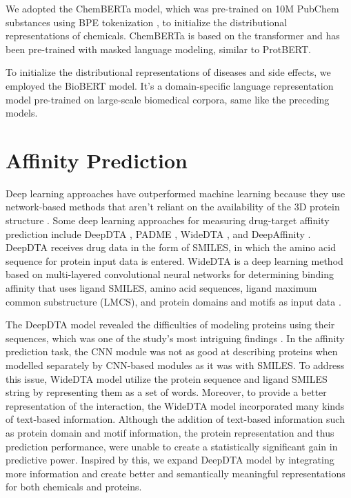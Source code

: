 We adopted the ChemBERTa \cite{chithrananda2020chemberta} model, which was pre-trained on 10M PubChem substances using BPE tokenization \cite{sennrich2015neural}, to initialize the distributional representations of chemicals. ChemBERTa is based on the transformer and has been pre-trained with masked language modeling, similar to ProtBERT.

To initialize the distributional representations of diseases and side effects, we employed the BioBERT \cite{lee2020biobert} model. It's a domain-specific language representation model pre-trained on large-scale biomedical corpora, same like the preceding models.

\section{Affinity Prediction}
Deep learning approaches have outperformed machine learning because they use network-based methods that aren't reliant on the availability of the 3D protein structure \cite{lounkine2012large}. Some deep learning approaches for measuring drug-target affinity prediction include DeepDTA \cite{ozturk2018deepdta}, PADME \cite{feng2018padme}, WideDTA \cite{ozturk2019widedta}, and DeepAffinity \cite{karimi2019deepaffinity}. DeepDTA receives drug data in the form of SMILES, in which the amino acid sequence for protein input data is entered. WideDTA is a deep learning method based on multi-layered convolutional neural networks for determining binding affinity that uses ligand SMILES, amino acid sequences, ligand maximum common substructure (LMCS), and protein domains and motifs as input data \cite{gao2018interpretable}.

The DeepDTA model revealed the difficulties of modeling proteins using their sequences, which was one of the study's most intriguing findings \cite{ozturk2018deepdta}. In the affinity prediction task, the CNN module was not as good at describing proteins when modelled separately by CNN-based modules as it was with SMILES. To address this issue, WideDTA model utilize the protein sequence and ligand SMILES string by representing them as a set of words. Moreover, to provide a better representation of the interaction, the WideDTA model incorporated many kinds of text-based information. Although the addition of text-based information such as protein domain and motif information, the protein representation and thus prediction performance, were unable to create a statistically significant gain in predictive power. Inspired by this, we expand DeepDTA model by integrating more information and create better and semantically meaningful representations for both chemicals and proteins.



